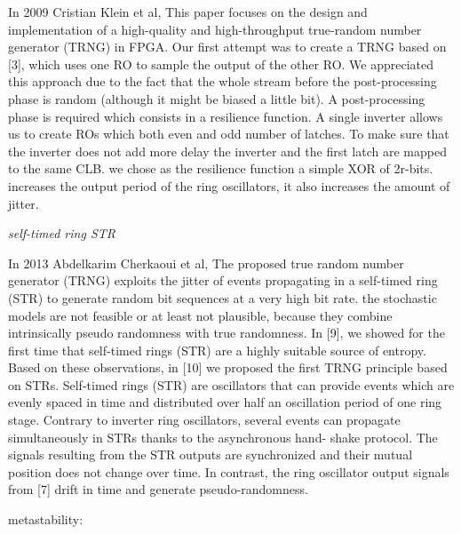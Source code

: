 In 2009 Cristian Klein et al, This paper focuses on the design and implementation of a high-quality and high-throughput true-random number generator (TRNG) in FPGA. Our first attempt was to create a TRNG based on [3], which uses one RO to sample the output of the other RO. We appreciated this approach due to the fact that the whole stream before the post-processing phase is random (although it might be biased a little bit). A post-processing phase is required which consists in a resilience function. A single inverter allows us to create ROs which both even and odd number of latches. To make sure that the inverter does not add more delay the inverter and the first latch are mapped to the same CLB. we chose as the resilience function a simple XOR of 2r-bits. increases the output period of the ring oscillators, it also increases the amount of jitter. 

\textit{self-timed ring STR}

In 2013 Abdelkarim Cherkaoui et al, The proposed true random number generator (TRNG) exploits the jitter of events propagating in a self-timed ring (STR) to generate random bit sequences at a very high bit rate. the stochastic models are not feasible or at least not plausible, because they combine intrinsically pseudo randomness with true randomness. 
In [9], we showed for the first time that self-timed rings (STR) are a highly suitable source of entropy. Based on these observations, in [10] we proposed the first TRNG principle based on STRs. Self-timed rings (STR) are oscillators that can provide events which are evenly spaced in time and distributed over half an oscillation period of one ring stage. Contrary to inverter ring oscillators, several events can propagate simultaneously in STRs thanks to the asynchronous hand- shake protocol. The signals resulting from the STR outputs are synchronized and their mutual position does not change over time. In contrast, the ring oscillator output signals from [7] drift in time and generate pseudo-randomness.

metastability: